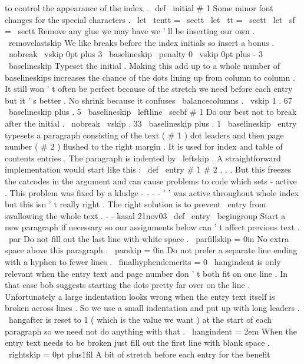 {{{to
control
the
appearance
of
the
index
.
\
def
\
initial
#
1
{
{
%
%
Some
minor
font
changes
for
the
special
characters
.
\
let
\
tentt
=
\
sectt
\
let
\
tt
=
\
sectt
\
let
\
sf
=
\
sectt
%
%
Remove
any
glue
we
may
have
we
'
ll
be
inserting
our
own
.
\
removelastskip
%
%
We
like
breaks
before
the
index
initials
so
insert
a
bonus
.
\
nobreak
\
vskip
0pt
plus
3
\
baselineskip
\
penalty
0
\
vskip
0pt
plus
-
3
\
baselineskip
%
%
Typeset
the
initial
.
Making
this
add
up
to
a
whole
number
of
%
baselineskips
increases
the
chance
of
the
dots
lining
up
from
column
%
to
column
.
It
still
won
'
t
often
be
perfect
because
of
the
stretch
%
we
need
before
each
entry
but
it
'
s
better
.
%
%
No
shrink
because
it
confuses
\
balancecolumns
.
\
vskip
1
.
67
\
baselineskip
plus
.
5
\
baselineskip
\
leftline
{
\
secbf
#
1
}
%
%
Do
our
best
not
to
break
after
the
initial
.
\
nobreak
\
vskip
.
33
\
baselineskip
plus
.
1
\
baselineskip
}
}
%
\
entry
typesets
a
paragraph
consisting
of
the
text
(
#
1
)
dot
leaders
and
%
then
page
number
(
#
2
)
flushed
to
the
right
margin
.
It
is
used
for
index
%
and
table
of
contents
entries
.
The
paragraph
is
indented
by
\
leftskip
.
%
%
A
straightforward
implementation
would
start
like
this
:
%
\
def
\
entry
#
1
#
2
{
.
.
.
%
But
this
freezes
the
catcodes
in
the
argument
and
can
cause
problems
to
%
code
which
sets
-
active
.
This
problem
was
fixed
by
a
kludge
-
-
-
%
-
'
'
was
active
throughout
whole
index
but
this
isn
'
t
really
right
.
%
The
right
solution
is
to
prevent
\
entry
from
swallowing
the
whole
text
.
%
-
-
kasal
21nov03
\
def
\
entry
{
%
\
begingroup
%
%
Start
a
new
paragraph
if
necessary
so
our
assignments
below
can
'
t
%
affect
previous
text
.
\
par
%
%
Do
not
fill
out
the
last
line
with
white
space
.
\
parfillskip
=
0in
%
%
No
extra
space
above
this
paragraph
.
\
parskip
=
0in
%
%
Do
not
prefer
a
separate
line
ending
with
a
hyphen
to
fewer
lines
.
\
finalhyphendemerits
=
0
%
%
\
hangindent
is
only
relevant
when
the
entry
text
and
page
number
%
don
'
t
both
fit
on
one
line
.
In
that
case
bob
suggests
starting
the
%
dots
pretty
far
over
on
the
line
.
Unfortunately
a
large
%
indentation
looks
wrong
when
the
entry
text
itself
is
broken
across
%
lines
.
So
we
use
a
small
indentation
and
put
up
with
long
leaders
.
%
%
\
hangafter
is
reset
to
1
(
which
is
the
value
we
want
)
at
the
start
%
of
each
paragraph
so
we
need
not
do
anything
with
that
.
\
hangindent
=
2em
%
%
When
the
entry
text
needs
to
be
broken
just
fill
out
the
first
line
%
with
blank
space
.
\
rightskip
=
0pt
plus1fil
%
%
A
bit
of
stretch
before
each
entry
for
the
benefit
}}}}}
